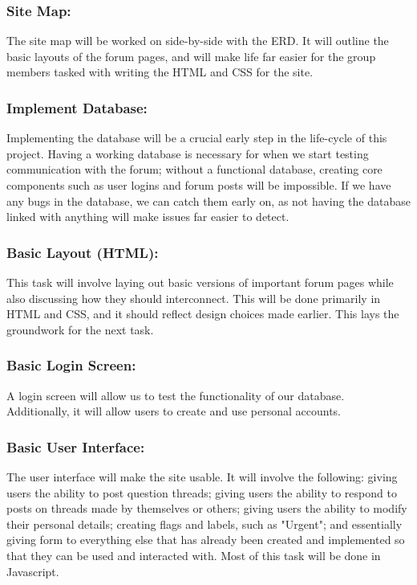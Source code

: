 \documentclass[12pt]{article}
\begin{document}
\subsubsection{Site Map:} 
\begin{flushleft} The site map will be worked on side-by-side with the ERD. It will outline the basic layouts of the forum pages, and will make life far easier for the group members tasked with writing the HTML and CSS for the site.
\end{flushleft}
\subsubsection{Implement Database:} 
\begin{flushleft}Implementing the database will be a crucial early step in the life-cycle of this project. Having a working database is necessary for when we start testing communication with the forum; without a functional database, creating core components such as user logins and forum posts will be impossible. If we have any bugs in the database, we can catch them early on, as not having the database linked with anything will make issues far easier to detect.
\end{flushleft}

\subsubsection{Basic Layout (HTML):} 
\begin{flushleft}This task will involve laying out basic versions of important forum pages while also discussing how they should interconnect. This will be done primarily in HTML and CSS, and it should reflect design choices made earlier. This lays the groundwork for the next task.
\end{flushleft}

\subsubsection{Basic Login Screen:} 
\begin{flushleft} A login screen will allow us to test the functionality of our database. Additionally, it will allow users to create and use personal accounts.
\end{flushleft}

\subsubsection{Basic User Interface:} 
\begin{flushleft} The user interface will make the site usable. It will involve the following: giving users the ability to post question threads; giving users the ability to respond to posts on threads made by themselves or others; giving users the ability to modify their personal details; creating flags and labels, such as "Urgent"; and essentially giving form to everything else that has already been created and implemented so that they can be used and interacted with. Most of this task will be done in Javascript.
\end{flushleft}
\end{document}
